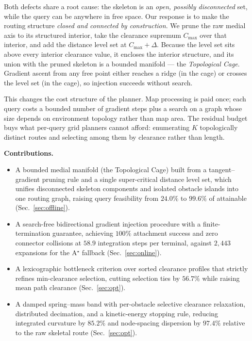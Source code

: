\documentclass[conference]{IEEEtran}
\begin{document}
Both defects share a root cause: the skeleton is an \emph{open, possibly disconnected} set, while the query can be anywhere in free space. Our response is to make the routing structure \emph{closed and connected by construction}. We prune the raw medial axis to its structured interior, take the clearance supremum $C_{\max}$ over that interior, and add the distance level set at $C_{\max}+\Delta$. Because the level set sits above every interior clearance value, it encloses the interior structure, and its union with the pruned skeleton is a bounded manifold --- the \emph{Topological Cage}. Gradient ascent from any free point either reaches a ridge (in the cage) or crosses the level set (in the cage), so injection succeeds without search.

This changes the cost structure of the planner. Map processing is paid once; each query costs a bounded number of gradient steps plus a search on a graph whose size depends on environment topology rather than map area. The residual budget buys what per-query grid planners cannot afford: enumerating $K$ topologically distinct routes and selecting among them by clearance rather than length.

\textbf{Contributions.}
\begin{itemize}
  \item A bounded medial manifold (the Topological Cage) built from a tangent--gradient pruning rule and a single super-critical distance level set, which unifies disconnected skeleton components and isolated obstacle islands into one routing graph, raising query feasibility from $24.0\%$ to $99.6\%$ of attainable (Sec.~\ref{sec:offline}).
  \item A search-free bidirectional gradient injection procedure with a finite-termination guarantee, achieving $100\%$ attachment success and zero connector collisions at $58.9$ integration steps per terminal, against $2{,}443$ expansions for the A$^\star$ fallback (Sec.~\ref{sec:online}).
  \item A lexicographic bottleneck criterion over sorted clearance profiles that strictly refines min-clearance selection, cutting selection ties by $56.7\%$ while raising mean path clearance (Sec.~\ref{sec:opt}).
  \item A damped spring--mass band with per-obstacle selective clearance relaxation, distributed decimation, and a kinetic-energy stopping rule, reducing integrated curvature by $85.2\%$ and node-spacing dispersion by $97.4\%$ relative to the raw skeletal route (Sec.~\ref{sec:opt}).
\end{itemize}
\end{document}
